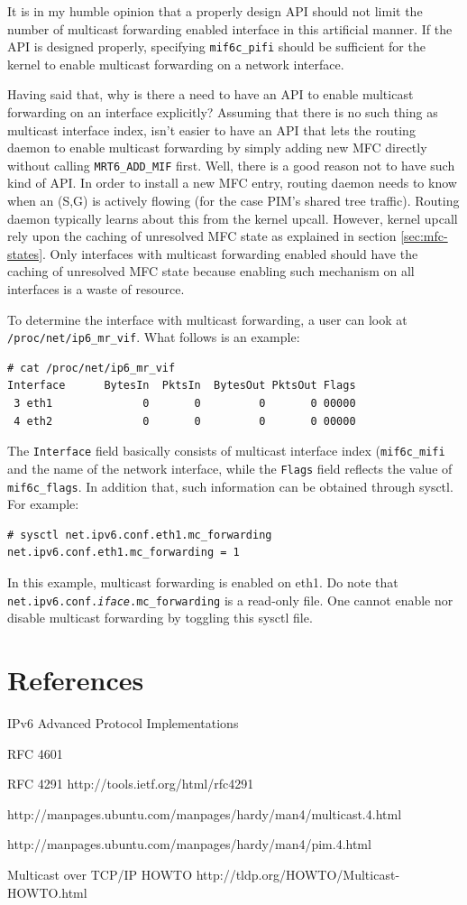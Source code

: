 \documentclass{article}
\begin{document}
It is in my humble opinion that a properly design API should not limit the
number of multicast forwarding enabled interface in this artificial manner. If
the API is designed properly, specifying \texttt{mif6c\_pifi} should be
sufficient for the kernel to enable multicast forwarding on a network interface.

Having said that, why is there a need to have an API to enable multicast
forwarding on an interface explicitly? Assuming that there is no such thing as
multicast interface index, isn't easier to have an API that lets the routing
daemon to enable multicast forwarding by simply adding new MFC directly without
calling \texttt{MRT6\_ADD\_MIF} first. Well, there is a good reason not to have
such kind of API. In order to install a new MFC entry, routing daemon needs to
know when an (S,G) is actively flowing (for the case PIM's shared tree traffic).
Routing daemon typically learns about this from the kernel upcall. However,
kernel upcall rely upon the caching of unresolved MFC state as explained in
section \ref{sec:mfc-states}. Only interfaces with multicast forwarding enabled
should have the caching of unresolved MFC state because enabling such mechanism
on all interfaces is a waste of resource.

To determine the interface with multicast forwarding, a user can look at
\texttt{/proc/net/ip6\_mr\_vif}. What follows is an example:
\begin{lstlisting}
# cat /proc/net/ip6_mr_vif
Interface      BytesIn  PktsIn  BytesOut PktsOut Flags
 3 eth1              0       0         0       0 00000
 4 eth2              0       0         0       0 00000
\end{lstlisting}

The \texttt{Interface} field basically consists of multicast interface index
(\texttt{mif6c\_mifi} and the name of the network interface, while the
\texttt{Flags} field reflects the value of \texttt{mif6c\_flags}. In addition
that, such information can be obtained through sysctl. For example:

\begin{lstlisting}
# sysctl net.ipv6.conf.eth1.mc_forwarding
net.ipv6.conf.eth1.mc_forwarding = 1
\end{lstlisting}

In this example, multicast forwarding is enabled on eth1. Do note that
\texttt{net.ipv6.conf.\textit{iface}.mc\_forwarding} is a read-only file. One
cannot enable nor disable multicast forwarding by toggling this sysctl file.

\section{References}
IPv6 Advanced Protocol Implementations

RFC 4601

RFC 4291 http://tools.ietf.org/html/rfc4291

http://manpages.ubuntu.com/manpages/hardy/man4/multicast.4.html

http://manpages.ubuntu.com/manpages/hardy/man4/pim.4.html

Multicast over TCP/IP HOWTO http://tldp.org/HOWTO/Multicast-HOWTO.html
\end{document}
